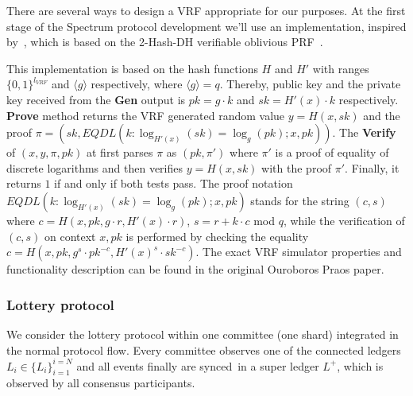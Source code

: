 There are several ways to design a VRF appropriate for our purposes.
At the first stage of the Spectrum protocol development we'll use an implementation, inspired by~\cite{cryptoeprint:2017/573}, which is based on the 2-Hash-DH verifiable oblivious PRF~\cite{asiacrypt:2014/233}.

This implementation is based on the hash functions $H$ and $H'$  with ranges $\{0,1\}^{l_{VRF}}$ and ${\langle g \rangle}$ respectively, where ${\langle g \rangle = q}$.
Thereby, public key and the private key received from the \textbf{Gen} output is ${pk = g \cdot k}$ and ${sk = H'(x) \cdot k}$ respectively.
\textbf{Prove} method returns the VRF generated random value ${y = H(x, sk)}$ and the proof ${\pi = (sk, EQDL(k : \log_{H'(x)}(sk) = \log_{g}(pk); x, pk))}$.
The \textbf{Verify} of ${(x, y, \pi, pk)}$ at first parses $\pi$ as ${(pk, \pi')}$ where $\pi'$ is a proof of equality of discrete logarithms and then verifies ${y = H(x, sk)}$ with the proof $\pi'$.
Finally, it returns $1$ if and only if both tests pass.
The proof notation ${EQDL(k : \log_{H'(x)}(sk) = \log_{g}(pk); x, pk)}$ stands for the string ${(c, s)}$ where $c = H(x, pk, g \cdot r, H'(x) \cdot r)$, ${s = r + k \cdot c}$ mod $q$, while the verification of ${(c, s)}$ on context ${x, pk}$ is performed by checking the equality
${c = H(x, pk, g^s \cdot pk^{-c}, H'(x)^s \cdot sk^{-c})}$.
The exact VRF simulator properties and functionality description can be found in the original Ouroboros Praos paper.

\subsubsection{Lottery protocol}
We consider the lottery protocol within one committee (one shard) integrated in the normal protocol flow.
Every committee observes one of the connected ledgers $L_i \in \{L_i\}_{i=1}^{i=N}$ and all events finally are synced\
in a super ledger $L^+$, which is observed by all consensus participants.

